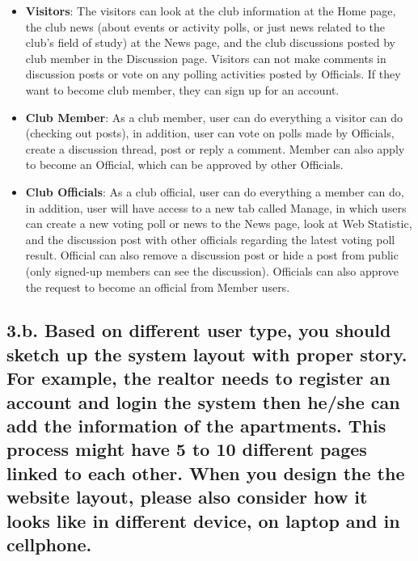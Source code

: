 \documentclass{article}
\begin{document}
\begin{itemize}
    \item \textbf{Visitors}: The visitors can look at the club information at the Home page, the club news (about events or activity polls, or just news related to the club's field of study) at the News page, and the club discussions posted by club member in the Discussion page. Visitors can not make comments in discussion posts or vote on any polling activities posted by Officials. If they want to become club member, they can sign up for an account.
    \item \textbf{Club Member}: As a club member, user can do everything a visitor can do (checking out posts), in addition, user can vote on polls made by Officials, create a discussion thread, post or reply a comment. Member can also apply to become an Official, which can be approved by other Officials.
    \item \textbf{Club Officials}: As a club official, user can do everything a member can do, in addition, user will have access to a new tab called Manage, in which users can create a new voting poll or news to the News page, look at Web Statistic, and the discussion post with other officials regarding the latest voting poll result. Official can also remove a discussion post or hide a post from public (only signed-up members can see the discussion). Officials can also approve the request to become an official from Member users.
\end{itemize}



\subsection{  3.b. Based on different user type, you should sketch up the system layout with proper story. For example, the realtor needs to register an account and login the system then he/she can add the information of the apartments. This process might have 5 to 10 different pages linked to each other. When you design the the website layout, please also consider how it looks like in different device, on laptop and in cellphone.}
  
  
  
\end{document}
